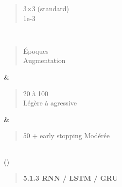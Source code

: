 \documentclass[
]{article}
\begin{document}
\begin{longtable}[]
\begin{minipage}[t]{\linewidth}
\begin{quote}
3×3 (standard)\\
1e-3
\end{quote}\strut
\end{minipage} \\
\begin{minipage}[t]{\linewidth}\raggedright
\begin{quote}
Époques\\
Augmentation
\end{quote}\strut
\end{minipage} & \begin{minipage}[t]{\linewidth}\raggedright
\begin{quote}
20 à 100\\
Légère à agressive
\end{quote}\strut
\end{minipage} & \begin{minipage}[t]{\linewidth}\raggedright
\begin{quote}
50 + early stopping Modérée
\end{quote}
\end{minipage} \\
\bottomrule()
\end{longtable}

\begin{quote}
\textbf{5.1.3 RNN / LSTM / GRU}
\end{quote}
\end{document}

